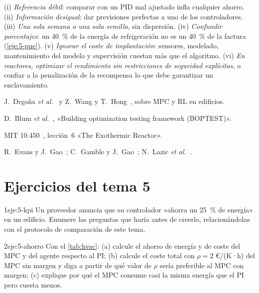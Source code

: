 \begin{observacion}\label{obs:errores5}
(i) \emph{Referencia débil}: comparar con un PID mal ajustado infla cualquier ahorro. (ii) \emph{Información desigual}: dar previsiones perfectas a uno de los controladores. (iii) \emph{Una sola semana o una sola semilla}, sin dispersión. (iv) \emph{Confundir porcentajes}: un 40~\% de la energía de refrigeración no es un 40~\% de la factura (\cref{eje:5-pue}). (v) \emph{Ignorar el coste de implantación}: sensores, modelado, mantenimiento del modelo y supervisión cuestan más que el algoritmo. (vi) \emph{En reactores, optimizar el rendimiento sin restricciones de seguridad explícitas}, o confiar a la penalización de la recompensa lo que debe garantizar un enclavamiento.
\end{observacion}

\begin{lecturas}
\item J.~Drgoňa \emph{et al.}~\cite{drgona} y Z.~Wang y T.~Hong~\cite{wanghong}, sobre MPC y RL en edificios.
\item D.~Blum \emph{et al.}~\cite{boptest}, «Building optimization testing framework (BOPTEST)».
\item MIT 10.450~\cite{mit10450}, lección~6 «The Exothermic Reactor».
\item R.~Evans y J.~Gao~\cite{evansgao}; C.~Gamble y J.~Gao~\cite{gamblegao}; N.~Lazic \emph{et al.}~\cite{lazic}.
\end{lecturas}

\section*{Ejercicios del tema 5}

\begin{ejercicio}{1}{eje:5-kpi}
Un proveedor anuncia que su controlador «ahorra un 25~\% de energía» en un edificio. Enumere las preguntas que haría antes de creerlo, relacionándolas con el protocolo de comparación de este tema.
\end{ejercicio}

\begin{ejercicio}{2}{eje:5-ahorro}
Con el \cref{tab:hvac}: (a) calcule el ahorro de energía y de coste del MPC y del agente respecto al PI; (b) calcule el coste total con $\rho=2$ €/(K·h) del MPC sin margen y diga a partir de qué valor de $\rho$ sería preferible al MPC con margen; (c) explique por qué el MPC consume casi la misma energía que el PI pero cuesta menos.
\end{ejercicio}


